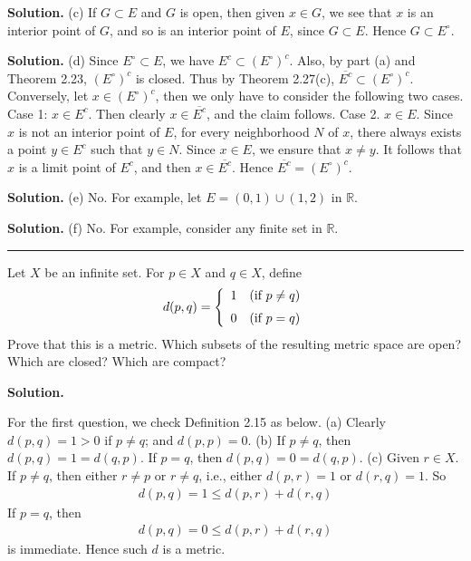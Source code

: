 \documentclass[12pt]{article}
\theoremstyle{definition}
\begin{document}
\smallskip
\noindent\textbf{Solution.}\quad
(c) If $G\subset E$ and $G$ is open, then given $x\in G$, we see that $x$ is an interior point of $G$, and so is an interior point of $E$, since $G\subset E$. Hence $G\subset E^\circ$.

\smallskip
\noindent\textbf{Solution.}\quad
(d) Since $E^\circ\subset E$, we have $E^c\subset(E^\circ)^c$. Also, by part (a) and Theorem 2.23, $(E^\circ)^c$ is closed. Thus by Theorem 2.27(c), $\overline{E^c}\subset(E^\circ)^c$. Conversely, let $x\in(E^\circ)^c$, then we only have to consider the following two cases.
Case 1: $x\in E^c$. Then clearly $x\in\overline{E^c}$, and the claim follows.
Case 2. $x\in E$. Since $x$ is not an interior point of $E$, for every neighborhood $N$ of $x$, there always exists a point $y\in E^c$ such that $y\in N$. Since $x\in E$, we ensure that $x\ne y$. It follows that $x$ is a limit point of $E^c$, and then $x\in\overline{E^c}$.
Hence $\overline{E^c}=(E^\circ)^c$.

\smallskip
\noindent\textbf{Solution.}\quad
(e) No. For example, let $E=(0,1)\cup(1,2)$ in $\mathbb{R}$.

\smallskip
\noindent\textbf{Solution.}\quad
(f) No. For example, consider any finite set in $\mathbb{R}$.



\bigskip\noindent\hrule\bigskip

Let $X$ be an infinite set. For $p\in X$ and $q\in X$, define
\begin{align*}
d(p,q)=\left\{
\begin{array}{ll}
1&(\mbox{if $p\ne q$})\vspace{0.08in}\\
0&(\mbox{if $p=q$})
\end{array}\right.
\end{align*}
Prove that this is a metric. Which subsets of the resulting metric space are open? Which are closed? Which are compact?

\smallskip
\noindent\textbf{Solution.}\quad

For the first question, we check Definition 2.15 as below.
(a) Clearly $d(p,q)=1>0$ if $p\ne q$; and $d(p,p)=0$.
(b) If $p\ne q$, then $d(p,q)=1=d(q,p)$. If $p=q$, then $d(p,q)=0=d(q,p)$.
(c) Given $r\in X$. If $p\ne q$, then either $r\ne p$ or $r\ne q$, i.e., either $d(p,r)=1$ or $d(r,q)=1$. So
\begin{align*}
d(p,q)=1\le d(p,r)+d(r,q)
\end{align*}
If $p=q$, then
\begin{align*}
d(p,q)=0\le d(p,r)+d(r,q)
\end{align*}
is immediate.
Hence such $d$ is a metric.
\end{document}
